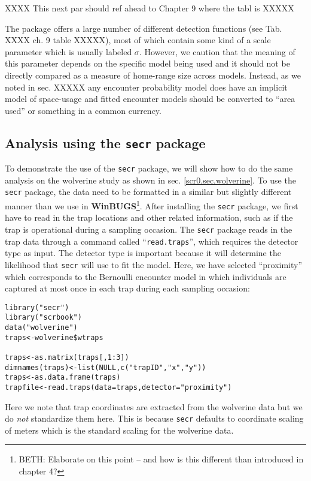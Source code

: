 XXXX This next par should ref ahead to Chapter 9 where the tabl is  XXXXX


The package \secr offers a large number of different detection
functions (see Tab. XXXX ch. 9 table XXXXX), most of which contain
some kind of a scale parameter which is usually labeled
$\sigma$. However, we caution that the meaning of this parameter
depends on the specific model being used and it should not be directly
compared as a measure of home-range size across models. Instead, as we
noted in sec. XXXXX any encounter probability model does have an
implicit model of space-usage and fitted encounter models should be
converted to ``area used'' or something in a common currency. 



\subsection{ Analysis using the \mbox{\tt secr} package}

To demonstrate the use of the \mbox{\tt secr} package, we will show how to do the
same analysis on the wolverine study as shown in
sec. \ref{scr0.sec.wolverine}. To use 
the \mbox{\tt secr} package, the data need to be formatted in a similar but
slightly different manner than we use in {\bf
  WinBUGS}\footnote{BETH: Elaborate on this point -- and how is this
  different than introduced in chapter 4?}.  After installing
the \mbox{\tt secr} package, we first have to read in the trap locations and
other related information, such as if the trap is operational during a
sampling occasion.  The \mbox{\tt secr} package reads in the trap data through a
command called ``\mbox{\tt read.traps}'', which requires the detector type as
input.  The detector type is important because it will determine the
likelihood that \mbox{\tt secr} will use to fit the model.  Here, we have
selected ``proximity'' which corresponds to the Bernoulli encounter
model in which individuals are captured at most once in
each trap during each sampling occasion:
{\small
\begin{verbatim}
library("secr")
library("scrbook")
data("wolverine")
traps<-wolverine$wtraps

traps<-as.matrix(traps[,1:3])
dimnames(traps)<-list(NULL,c("trapID","x","y"))
traps<-as.data.frame(traps)
trapfile<-read.traps(data=traps,detector="proximity")
\end{verbatim}
}
Here we note that trap coordinates are extracted from the wolverine
data but we do {\it not} standardize them here. This is because
\mbox{\tt secr} defaults to coordinate scaling of meters which is the
standard scaling for the wolverine data. 

